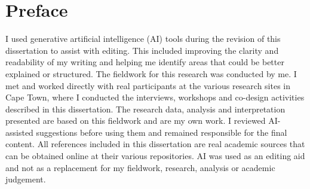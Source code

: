 \chapter*{Preface}
\thispagestyle{plain}

I used generative artificial intelligence (AI) tools during the revision of this dissertation to assist with editing. This included improving the clarity and readability of my writing and helping me identify areas that could be better explained or structured. The fieldwork for this research was conducted by me. I met and worked directly with real participants at the various research sites in Cape Town, where I conducted the interviews, workshops and co-design activities described in this dissertation. The research data, analysis and interpretation presented are based on this fieldwork and are my own work. I reviewed AI-assisted suggestions before using them and remained responsible for the final content. All references included in this dissertation are real academic sources that can be obtained online at their various repositories. AI was used as an editing aid and not as a replacement for my fieldwork, research, analysis or academic judgement.